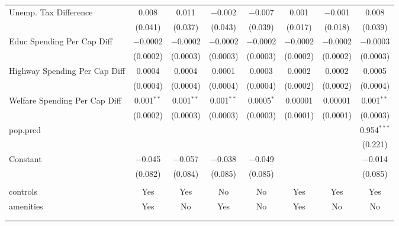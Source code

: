 \begin{table}[!htbp]
\begin{tabular}{@{\extracolsep{5pt}}lccccccc}
  Unemp. Tax Difference & 0.008 & 0.011 & $-$0.002 & $-$0.007 & 0.001 & $-$0.001 & 0.008 \\ 
  & (0.041) & (0.037) & (0.043) & (0.039) & (0.017) & (0.018) & (0.039) \\ 
  Educ Spending Per Cap Diff & $-$0.0002 & $-$0.0002 & $-$0.0002 & $-$0.0002 & $-$0.0002 & $-$0.0002 & $-$0.0003 \\ 
  & (0.0002) & (0.0003) & (0.0003) & (0.0003) & (0.0002) & (0.0002) & (0.0003) \\ 
  Highway Spending Per Cap Diff & 0.0004 & 0.0004 & 0.0001 & 0.0003 & 0.0002 & 0.0002 & 0.0005 \\ 
  & (0.0004) & (0.0004) & (0.0004) & (0.0004) & (0.0002) & (0.0002) & (0.0004) \\ 
  Welfare Spending Per Cap Diff & 0.001$^{**}$ & 0.001$^{**}$ & 0.001$^{**}$ & 0.0005$^{*}$ & 0.00001 & 0.00001 & 0.001$^{**}$ \\ 
  & (0.0002) & (0.0003) & (0.0003) & (0.0003) & (0.0001) & (0.0001) & (0.0003) \\ 
  pop.pred &  &  &  &  &  &  & 0.954$^{***}$ \\ 
  &  &  &  &  &  &  & (0.221) \\ 
  Constant & $-$0.045 & $-$0.057 & $-$0.038 & $-$0.049 &  &  & $-$0.014 \\ 
  & (0.082) & (0.084) & (0.085) & (0.085) &  &  & (0.085) \\ 
 \hline \\[-1.8ex] 
controls & Yes & Yes & No & No & Yes & Yes & Yes \\ 
amenities & Yes & No & Yes & No & Yes & No & No \\ 
\hline \\[-1.8ex] 
\hline 
\hline \\[-1.8ex] 
\end{tabular} 
\end{table} 
